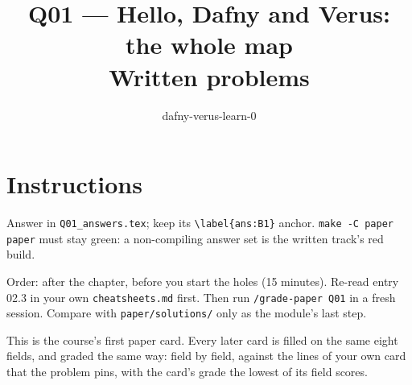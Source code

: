 \documentclass[11pt]{article}
\title{Q01 --- Hello, Dafny and Verus: the whole map \\ \large Written problems}
\author{dafny-verus-learn-0}
\date{}
\begin{document}
\maketitle

\section*{Instructions}
Answer in \texttt{Q01\_answers.tex}; keep its \verb+\label{ans:B1}+ anchor.
\texttt{make -C paper paper} must stay green: a non-compiling answer set is the
written track's red build.

Order: after the chapter, before you start the holes (15 minutes). Re-read
entry 02.3 in your own \texttt{cheatsheets.md} first. Then run
\texttt{/grade-paper Q01} in a fresh session. Compare with
\texttt{paper/solutions/} only as the module's last step.

This is the course's first paper card. Every later card is filled on the same
eight fields, and graded the same way: field by field, against the lines of
your own card that the problem pins, with the card's grade the lowest of its
field scores.
\end{document}
